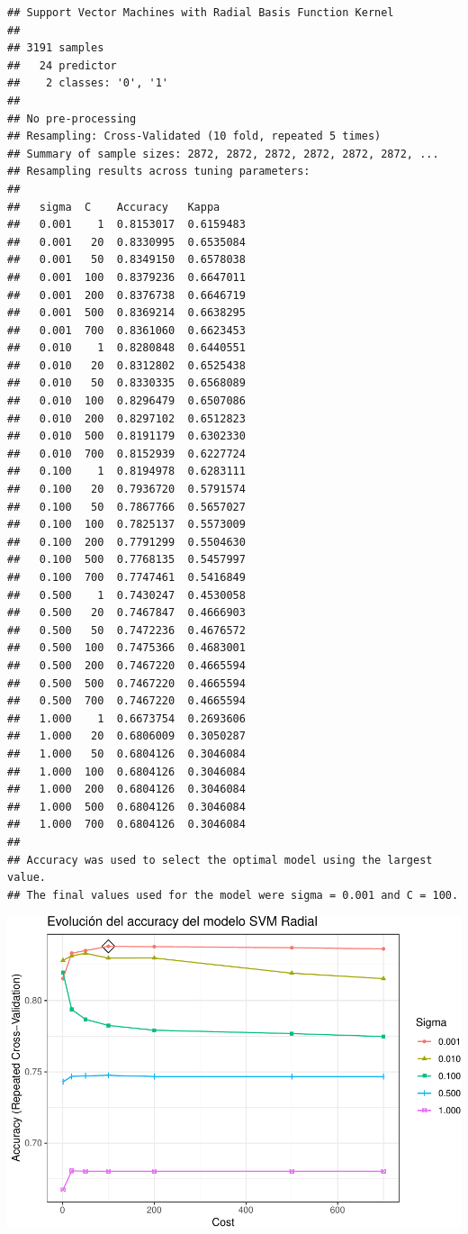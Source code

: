 \documentclass[]{article}
\begin{document}
\begin{lstlisting}
## Support Vector Machines with Radial Basis Function Kernel 
## 
## 3191 samples
##   24 predictor
##    2 classes: '0', '1' 
## 
## No pre-processing
## Resampling: Cross-Validated (10 fold, repeated 5 times) 
## Summary of sample sizes: 2872, 2872, 2872, 2872, 2872, 2872, ... 
## Resampling results across tuning parameters:
## 
##   sigma  C    Accuracy   Kappa    
##   0.001    1  0.8153017  0.6159483
##   0.001   20  0.8330995  0.6535084
##   0.001   50  0.8349150  0.6578038
##   0.001  100  0.8379236  0.6647011
##   0.001  200  0.8376738  0.6646719
##   0.001  500  0.8369214  0.6638295
##   0.001  700  0.8361060  0.6623453
##   0.010    1  0.8280848  0.6440551
##   0.010   20  0.8312802  0.6525438
##   0.010   50  0.8330335  0.6568089
##   0.010  100  0.8296479  0.6507086
##   0.010  200  0.8297102  0.6512823
##   0.010  500  0.8191179  0.6302330
##   0.010  700  0.8152939  0.6227724
##   0.100    1  0.8194978  0.6283111
##   0.100   20  0.7936720  0.5791574
##   0.100   50  0.7867766  0.5657027
##   0.100  100  0.7825137  0.5573009
##   0.100  200  0.7791299  0.5504630
##   0.100  500  0.7768135  0.5457997
##   0.100  700  0.7747461  0.5416849
##   0.500    1  0.7430247  0.4530058
##   0.500   20  0.7467847  0.4666903
##   0.500   50  0.7472236  0.4676572
##   0.500  100  0.7475366  0.4683001
##   0.500  200  0.7467220  0.4665594
##   0.500  500  0.7467220  0.4665594
##   0.500  700  0.7467220  0.4665594
##   1.000    1  0.6673754  0.2693606
##   1.000   20  0.6806009  0.3050287
##   1.000   50  0.6804126  0.3046084
##   1.000  100  0.6804126  0.3046084
##   1.000  200  0.6804126  0.3046084
##   1.000  500  0.6804126  0.3046084
##   1.000  700  0.6804126  0.3046084
## 
## Accuracy was used to select the optimal model using the largest value.
## The final values used for the model were sigma = 0.001 and C = 100.
\end{lstlisting}

\includegraphics{analisis_de_muchos_modelos_files/figure-latex/unnamed-chunk-32-1.pdf}
\end{document}
